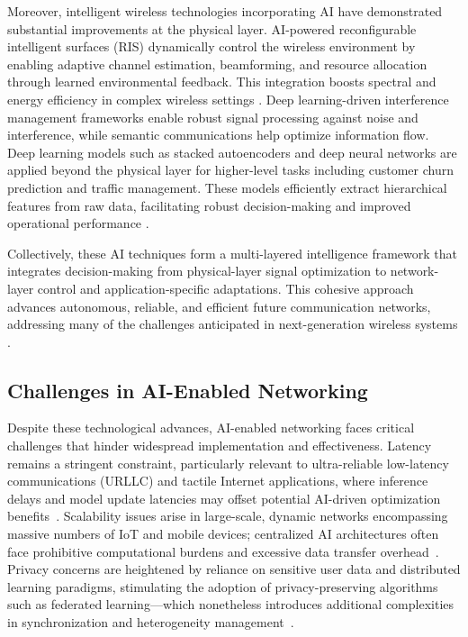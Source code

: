 \documentclass[sigconf]{acmart}
\begin{document}
Moreover, intelligent wireless technologies incorporating AI have demonstrated substantial improvements at the physical layer. AI-powered reconfigurable intelligent surfaces (RIS) dynamically control the wireless environment by enabling adaptive channel estimation, beamforming, and resource allocation through learned environmental feedback. This integration boosts spectral and energy efficiency in complex wireless settings \cite{ref16,ref49}. Deep learning-driven interference management frameworks enable robust signal processing against noise and interference, while semantic communications help optimize information flow. Deep learning models such as stacked autoencoders and deep neural networks are applied beyond the physical layer for higher-level tasks including customer churn prediction and traffic management. These models efficiently extract hierarchical features from raw data, facilitating robust decision-making and improved operational performance \cite{ref16}.

Collectively, these AI techniques form a multi-layered intelligence framework that integrates decision-making from physical-layer signal optimization to network-layer control and application-specific adaptations. This cohesive approach advances autonomous, reliable, and efficient future communication networks, addressing many of the challenges anticipated in next-generation wireless systems \cite{ref11,ref49,ref50}.

\subsection{Challenges in AI-Enabled Networking}

Despite these technological advances, AI-enabled networking faces critical challenges that hinder widespread implementation and effectiveness. Latency remains a stringent constraint, particularly relevant to ultra-reliable low-latency communications (URLLC) and tactile Internet applications, where inference delays and model update latencies may offset potential AI-driven optimization benefits~\cite{ref26,ref27}. Scalability issues arise in large-scale, dynamic networks encompassing massive numbers of IoT and mobile devices; centralized AI architectures often face prohibitive computational burdens and excessive data transfer overhead~\cite{ref28,ref52}. Privacy concerns are heightened by reliance on sensitive user data and distributed learning paradigms, stimulating the adoption of privacy-preserving algorithms such as federated learning—which nonetheless introduces additional complexities in synchronization and heterogeneity management~\cite{ref29,ref52}.
\end{document}

